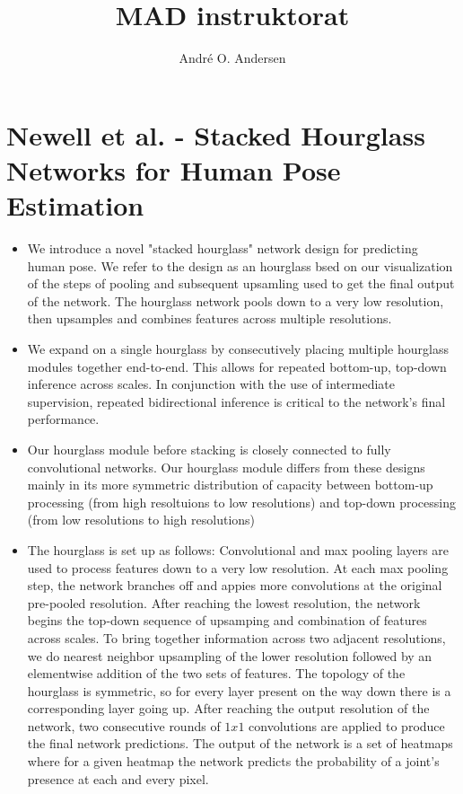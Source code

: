 \documentclass{report}
\title{MAD instruktorat}
\author{André O. Andersen}
\begin{document}
\maketitle

\section{Newell et al. - Stacked Hourglass Networks for Human Pose Estimation}
\begin{itemize}
    \item We introduce a novel "stacked hourglass" network design for predicting human pose. We refer to the design as an hourglass bsed on our visualization of the steps of pooling and subsequent upsamling used to get the final output of the network. The hourglass network pools down to a very low resolution, then upsamples and combines features across multiple resolutions.
    \item We expand on a single hourglass by consecutively placing multiple hourglass modules together end-to-end. This allows for repeated bottom-up, top-down inference across scales. In conjunction with the use of intermediate supervision, repeated bidirectional inference is critical to the network's final performance. 
    \item Our hourglass module before stacking is closely connected to fully convolutional networks. Our hourglass module differs from these designs mainly in its more symmetric distribution of capacity between bottom-up processing (from high resoltuions to low resolutions) and top-down processing (from low resolutions to high resolutions)
    \item The hourglass is set up as follows: Convolutional and max pooling layers are used to process features down to a very low resolution. At each max pooling step, the network branches off and appies more convolutions at the original pre-pooled resolution. After reaching the lowest resolution, the network begins the top-down sequence of upsamping and combination of features across scales. To bring together information across two adjacent resolutions, we do nearest neighbor upsampling of the lower resolution followed by an elementwise addition of the two sets of features. The topology of the hourglass is symmetric, so for every layer present on the way down there is a corresponding layer going up. After reaching the output resolution of the network, two consecutive rounds of $1x1$ convolutions are applied to produce the final network predictions. The output of the network is a set of heatmaps where for a given heatmap the network predicts the probability of a joint's presence at each and every pixel.

\end{itemize}
\end{document}
